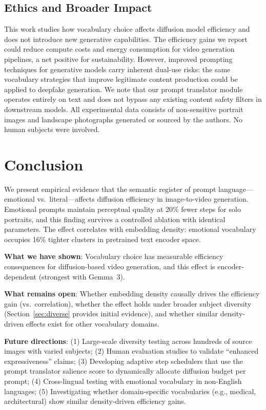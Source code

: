 \documentclass[10pt,twocolumn,letterpaper]{article}
\begin{document}
\subsection{Ethics and Broader Impact}

This work studies how vocabulary choice affects diffusion model efficiency and does not introduce new generative capabilities. The efficiency gains we report could reduce compute costs and energy consumption for video generation pipelines, a net positive for sustainability. However, improved prompting techniques for generative models carry inherent dual-use risks: the same vocabulary strategies that improve legitimate content production could be applied to deepfake generation. We note that our prompt translator module operates entirely on text and does not bypass any existing content safety filters in downstream models. All experimental data consists of non-sensitive portrait images and landscape photographs generated or sourced by the authors. No human subjects were involved.

\section{Conclusion}

We present empirical evidence that the semantic register of prompt language---emotional vs.\ literal---affects diffusion efficiency in image-to-video generation. Emotional prompts maintain perceptual quality at 20\% fewer steps for solo portraits, and this finding survives a controlled ablation with identical parameters. The effect correlates with embedding density: emotional vocabulary occupies 16\% tighter clusters in pretrained text encoder space.

\textbf{What we have shown}: Vocabulary choice has measurable efficiency consequences for diffusion-based video generation, and this effect is encoder-dependent (strongest with Gemma~3).

\textbf{What remains open}: Whether embedding density causally drives the efficiency gain (vs.\ correlation), whether the effect holds under broader subject diversity (Section~\ref{sec:diverse} provides initial evidence), and whether similar density-driven effects exist for other vocabulary domains.

\textbf{Future directions}: (1) Large-scale diversity testing across hundreds of source images with varied subjects; (2) Human evaluation studies to validate ``enhanced expressiveness'' claims; (3) Developing adaptive step schedulers that use the prompt translator salience score to dynamically allocate diffusion budget per prompt; (4) Cross-lingual testing with emotional vocabulary in non-English languages; (5) Investigating whether domain-specific vocabularies (e.g., medical, architectural) show similar density-driven efficiency gains.
\end{document}
